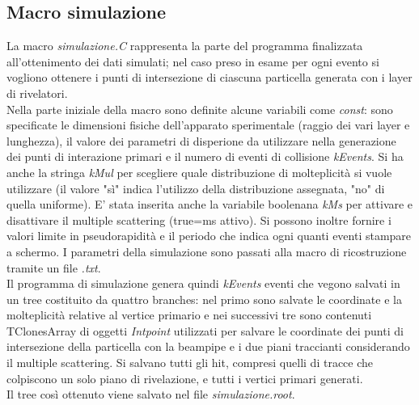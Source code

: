 \documentclass{article}
\begin{document}
\subsection{Macro simulazione}
La macro \textit{simulazione.C} rappresenta la parte del programma finalizzata all'ottenimento dei dati simulati; nel caso preso in esame per ogni evento si vogliono ottenere i punti di intersezione di ciascuna particella generata con i layer di rivelatori. 
\\
Nella parte iniziale della macro sono definite alcune variabili come \textit{const}: sono specificate le dimensioni fisiche dell'apparato sperimentale (raggio dei vari layer e lunghezza), il valore dei parametri di disperione da utilizzare nella generazione dei punti di interazione primari e il numero di eventi di collisione \textit{kEvents}. Si ha anche la stringa \textit{kMul} per scegliere quale distribuzione di molteplicità si vuole utilizzare (il valore "sì" indica l'utilizzo della distribuzione assegnata, "no" di quella uniforme). E' stata inserita anche la variabile boolenana \textit{kMs} per attivare e disattivare il multiple scattering (true=ms attivo). Si possono inoltre fornire i valori limite in pseudorapidità e il periodo che indica ogni quanti eventi stampare a schermo. I parametri della simulazione sono passati alla macro di ricostruzione tramite un file \textit{.txt}.
\\
Il programma di simulazione genera quindi \textit{kEvents} eventi che vegono salvati in un tree costituito da quattro branches: nel primo sono salvate le coordinate e la molteplicità relative al vertice primario e nei successivi tre sono contenuti TClonesArray di oggetti \textit{Intpoint} utilizzati per salvare le coordinate dei punti di intersezione della particella con la beampipe e i due piani traccianti considerando il multiple scattering.
Si salvano tutti gli hit, compresi quelli di tracce che colpiscono un solo piano di rivelazione, e tutti i vertici primari generati.
\\
Il tree così ottenuto viene salvato nel file \textit{simulazione.root}.
\end{document}

